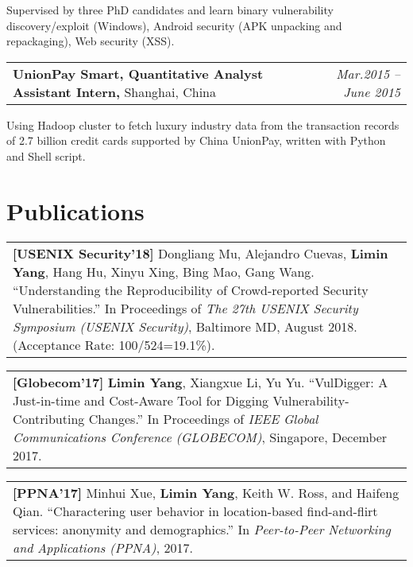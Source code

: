 \documentclass[a4paper,10pt]{article}
\newenvironment{packed_itemize}{
\begin{list}{\labelitemi}{\leftmargin=2em}
\setlength{\itemsep}{0pt}
\setlength{\parskip}{0pt}
\setlength{\parsep}{0pt}
\setlength{\headsep}{0pt}
\setlength{\topskip}{0pt}
\setlength{\topmargin}{0pt}
\setlength{\topsep}{0pt}
\setlength{\partopsep}{0pt}
}{\end{list}}
\begin{document}
\begin{packed_itemize}
\item Supervised by three PhD candidates and learn binary vulnerability discovery/exploit
(Windows), Android security (APK unpacking and repackaging), Web security (XSS).
\end{packed_itemize}

\begin{tabular}{p{15cm}r}
\textbf{UnionPay Smart, Quantitative Analyst Assistant Intern,} Shanghai, China & \emph{Mar.2015 – June 2015} \\
\end{tabular}

\begin{packed_itemize}
\item Using Hadoop cluster to fetch luxury industry data from the transaction records of 2.7 billion
credit cards supported by China UnionPay, written with Python and Shell script.
\end{packed_itemize}
\vspace{-0.2cm}

\section{Publications}
\vspace{-0.2cm}
\begin{tabular}{p{18cm}}
\textbf{[USENIX Security'18]} Dongliang Mu, Alejandro Cuevas, \textbf{Limin Yang}, Hang Hu, Xinyu Xing, Bing Mao, Gang Wang. ``Understanding the Reproducibility of Crowd-reported Security Vulnerabilities.'' In Proceedings of \textit{The 27th USENIX Security Symposium (USENIX Security)}, Baltimore MD, August 2018. (Acceptance Rate: 100/524=19.1\%).
\end{tabular}
\vspace{-0.1cm}

\begin{tabular}{p{18cm}}
\textbf{[Globecom'17]} \textbf{Limin Yang}, Xiangxue Li, Yu Yu. ``VulDigger: A Just-in-time and Cost-Aware Tool for Digging Vulnerability-Contributing Changes.'' In Proceedings of \textit{IEEE Global Communications Conference (GLOBECOM)}, Singapore, December 2017.
\end{tabular}
\vspace{-0.1cm}

\begin{tabular}{p{18cm}}
\textbf{[PPNA'17]} Minhui Xue, \textbf{Limin Yang}, Keith W. Ross, and Haifeng Qian. ``Charactering user behavior in location-based find-and-flirt services: anonymity and demographics.'' In \textit{Peer-to-Peer Networking and Applications (PPNA)}, 2017.
\end{tabular}
\vspace{-0.2cm}
\end{document}
